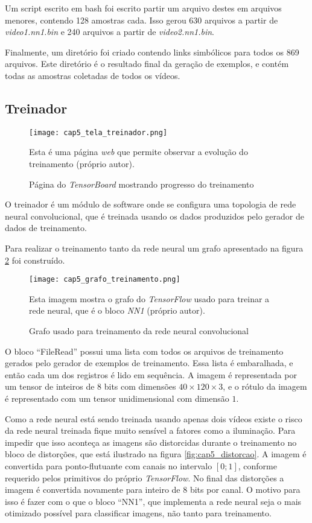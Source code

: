 Um script escrito em bash foi escrito partir um arquivo destes em arquivos
menores, contendo 128 amostras cada. Isso gerou 630 arquivos a partir de
\emph{video1.nn1.bin} e 240 arquivos a partir de \emph{video2.nn1.bin}.

Finalmente, um diretório foi criado contendo links simbólicos para todos os 869
arquivos. Este diretório é o resultado final da geração de exemplos, e contém
todas as amostras coletadas de todos os vídeos.

\subsection{Treinador}

\begin{figure}[!htb]
	\centering
	\texttt{[image: cap5\_tela\_treinador.png]}
	\caption{Página do \emph{TensorBoard} mostrando progresso do treinamento}
	\label{fig:cap5_tela_treinador}
	Esta é uma página \emph{web} que permite observar a evolução do
	treinamento (próprio autor).
\end{figure}

O treinador é um módulo de software onde se configura uma topologia de rede
neural convolucional, que é treinada usando os dados produzidos pelo gerador de
dados de treinamento.

Para realizar o treinamento tanto da rede neural um grafo apresentado na figura
\ref{fig:cap5_grafo_treinamento} foi construído.

\begin{figure}[!htb]
	\centering
	\texttt{[image: cap5\_grafo\_treinamento.png]}
	\caption{Grafo usado para treinamento da rede neural convolucional}
	\label{fig:cap5_grafo_treinamento}
	Esta imagem mostra o grafo do \emph{TensorFlow} usado para treinar
	a rede neural, que é o bloco \emph{NN1} (próprio autor).
\end{figure}

O bloco “FileRead” possui uma lista com todos os arquivos de treinamento
gerados pelo gerador de exemplos de treinamento. Essa lista é embaralhada, e
então cada um dos registros é lido em sequência. A imagem é representada por um
tensor de inteiros de 8 bits com dimensões $40 \times 120 \times 3$, e o
rótulo da imagem é representado com um tensor unidimensional com dimensão $1$.

Como a rede neural está sendo treinada usando apenas dois vídeos existe o risco
da rede neural treinada fique muito sensível a fatores como a iluminação. Para
impedir que isso aconteça as imagens são distorcidas durante o treinamento no
bloco de distorções, que está ilustrado na figura \ref{fig:cap5_distorcao}.
A imagem é convertida para ponto-flutuante com canais no intervalo $[0;1]$,
conforme requerido pelos primitivos do próprio \emph{TensorFlow}.
No final das distorções a imagem é convertida
novamente para inteiro de 8 bits por canal. O motivo para isso é fazer com o
que o bloco “NN1”, que implementa a rede neural seja o mais otimizado possível
para classificar imagens, não tanto para treinamento.

